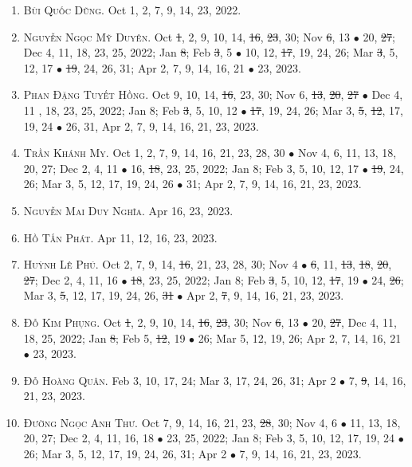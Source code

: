 \documentclass{article}
\begin{document}
\begin{enumerate}
	\item \textsc{Bùi Quốc Dũng.} {\sf[In]} Oct 1, 2, 7, 9, 14, 23, 2022. {\sf[Out]}
	\item \textsc{Nguyễn Ngọc Mỹ Duyên.} {\sf[In]} Oct \st{1}, 2, 9, 10, 14, \st{16}, \st{23}, 30; Nov \st{6}, 13 $\bullet$ 20, \st{27}; Dec 4, 11, 18, 23, 25, 2022; Jan \st{8}; Feb \st{3}, 5 $\bullet$ 10, 12, \st{17}, 19, 24, 26; Mar \st{3}, 5, 12, 17 $\bullet$ \st{19}, 24, 26, 31; Apr 2, 7, 9, 14, 16, 21 $\bullet$ 23, 2023.
	\item \textsc{Phan Đặng Tuyết Hồng.} {\sf[In]} Oct 9, 10, 14, \st{16}, 23, 30; Nov 6, \st{13}, \st{20}, \st{27} $\bullet$ Dec 4, 11 , 18, 23, 25, 2022; Jan 8; Feb \st{3}, 5, 10, 12 $\bullet$ \st{17}, 19, 24, 26; Mar 3, \st{5}, \st{12}, 17, 19, 24 $\bullet$ 26, 31, Apr 2, 7, 9, 14, 16, 21, 23, 2023.
	\item \textsc{Trần Khánh My.} {\sf[In]} Oct 1, 2, 7, 9, 14, 16, 21, 23, 28, 30 $\bullet$ Nov 4, 6, 11, 13, 18, 20, 27; Dec 2, 4, 11 $\bullet$ 16, \st{18}, 23, 25, 2022; Jan 8; Feb 3, 5, 10, 12, 17 $\bullet$ \st{19}, 24, 26; Mar 3, 5, 12, 17, 19, 24, 26 $\bullet$ 31; Apr 2, 7, 9, 14, 16, 21, 23, 2023.
	\item \textsc{Nguyễn Mai Duy Nghĩa.} {\sf[In]} Apr 16, 23, 2023.
	\item \textsc{Hồ Tấn Phát.} {\sf[In]} Apr 11, 12, 16, 23, 2023.
	\item \textsc{Huỳnh Lê Phú.} {\sf[In]} Oct 2, 7, 9, 14, \st{16}, 21, 23, 28, 30; Nov 4 $\bullet$ \st{6}, 11, \st{13}, \st{18}, \st{20}, \st{27}; Dec 2, 4, 11, 16 $\bullet$ \st{18}, 23, 25, 2022; Jan 8; Feb \st{3}, 5, 10, 12, \st{17}, 19 $\bullet$ 24, \st{26}; Mar 3, \st{5}, 12, 17, 19, 24, 26, \st{31} $\bullet$ Apr 2, \st{7}, 9, 14, 16, 21, 23, 2023.
	\item \textsc{Đỗ Kim Phụng.} {\sf[In]} Oct \st{1}, 2, 9, 10, 14, \st{16}, \st{23}, 30; Nov \st{6}, 13 $\bullet$ 20, \st{27}, Dec 4, 11, 18, 25, 2022; Jan \st{8}; Feb 5, \st{12}, 19 $\bullet$ 26; Mar 5, 12, 19, 26; Apr 2, 7, 14, 16, 21 $\bullet$ 23, 2023.
	\item \textsc{Đỗ Hoàng Quân.} {\sf[In]} Feb 3, 10, 17, 24; Mar 3, 17, 24, 26, 31; Apr 2 $\bullet$ 7, \st{9}, 14, 16, 21, 23, 2023.
	\item \textsc{Đường Ngọc Anh Thư.} {\sf[In]} Oct 7, 9, 14, 16, 21, 23, \st{28}, 30; Nov 4, 6 $\bullet$ 11, 13, 18, 20, 27; Dec 2, 4, 11, 16, 18 $\bullet$ 23, 25, 2022; Jan 8; Feb 3, 5, 10, 12, 17, 19, 24 $\bullet$ 26; Mar 3, 5, 12, 17, 19, 24, 26, 31; Apr 2 $\bullet$ 7, 9, 14, 16, 21, 23, 2023.
\end{enumerate}
\end{document}
